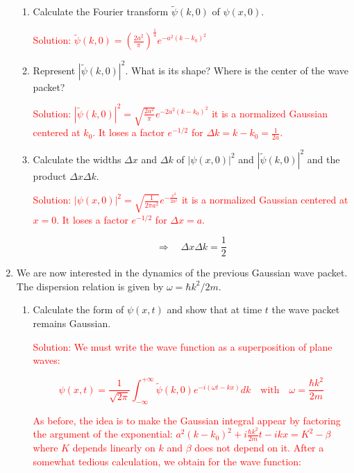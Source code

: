 \documentclass{article}
\begin{document}
\begin{enumerate}
    \begin{enumerate}
        \item Calculate the Fourier transform $\tilde{\psi}(k, 0)$ of $\psi(x, 0)$.

        \textcolor{red}{Solution: $\tilde{\psi}(k, 0) = \left(\frac{2 a^{2}}{\pi}\right)^{\frac{1}{4}} e^{-a^{2}\left(k-k_{0}\right)^{2}}$}

        \item Represent $|\tilde{\psi}(k, 0)|^{2}$. What is its shape? Where is the center of the wave packet?

        \textcolor{red}{Solution: $|\tilde{\psi}(k, 0)|^{2} = \sqrt{\frac{2 a^{2}}{\pi}} e^{-2 a^{2}\left(k-k_{0}\right)^{2}}$ it is a normalized Gaussian centered at $k_{0}$. It loses a factor $e^{-1 / 2}$ for $\Delta k = k - k_{0} = \frac{1}{2 a}$.}

        \item Calculate the widths $\Delta x$ and $\Delta k$ of $|\psi(x, 0)|^{2}$ and $|\tilde{\psi}(k, 0)|^{2}$ and the product $\Delta x \Delta k$.

        \textcolor{red}{Solution: $|\psi(x, 0)|^{2} = \sqrt{\frac{1}{2 \pi a^{2}}} e^{-\frac{x^{2}}{2 a^{2}}}$ it is a normalized Gaussian centered at $x=0$. It loses a factor $e^{-1 / 2}$ for $\Delta x = a$.}

        $$
        \Rightarrow \quad \Delta x \Delta k = \frac{1}{2}
        $$
    \end{enumerate}

    \item We are now interested in the dynamics of the previous Gaussian wave packet. The dispersion relation is given by $\omega = \hbar k^{2} / 2 m$.

    \begin{enumerate}
        \item Calculate the form of $\psi(x, t)$ and show that at time $t$ the wave packet remains Gaussian.

        \textcolor{red}{Solution: We must write the wave function as a superposition of plane waves:

        $$
        \psi(x, t) = \frac{1}{\sqrt{2 \pi}} \int_{-\infty}^{+\infty} \tilde{\psi}(k, 0) e^{-i(\omega t - k x)} dk \quad \text{with} \quad \omega = \frac{\hbar k^{2}}{2 m}
        $$

        As before, the idea is to make the Gaussian integral appear by factoring the argument of the exponential:
        $a^{2}\left(k-k_{0}\right)^{2} + i \frac{\hbar k^{2}}{2 m} t - i k x = K^{2} - \beta$ where $K$ depends linearly on $k$ and $\beta$ does not depend on it.
        After a somewhat tedious calculation, we obtain for the wave function:

}
\end{enumerate}
\end{enumerate}
\end{document}
